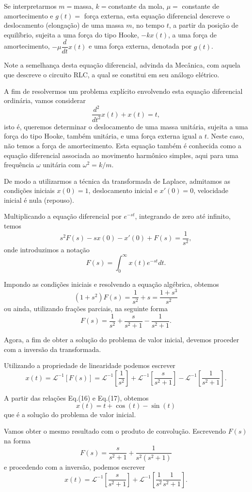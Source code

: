 Se interpretarmos $m=$massa, $k=$constante da mola, $\mu=$ constante de amortecimento e $g(t)=$ força externa, esta equação diferencial descreve o deslocamento (elongação) de uma massa $m$, no tempo $t$, a partir da posição de equilíbrio, sujeita a uma força do tipo Hooke, $-k x(t)$, a uma força de amortecimento, $-\mu \dfrac{d}{dt} x(t)$ e uma força externa, denotada por $g(t)$.

Note a semelhança desta equação diferencial, advinda da Mecânica, com aquela que descreve o circuito RLC, a qual se constitui em seu análogo elétrico.

A fim de resolvermos um problema explícito envolvendo esta equação diferencial ordinária, vamos considerar
$$\dfrac{d^{2}}{dt^{2}} x(t) + x(t) = t,$$
isto é, queremos determinar o deslocamento de uma massa unitária, sujeita a uma força do tipo Hooke, também unitária, e uma força externa igual a $t$. Neste caso, não temos a força de amortecimento. Esta equação também é conhecida como a equação diferencial associada ao movimento harmônico simples, aqui para uma frequência $\omega$ unitária com $\omega^{2} = k/m$.

De modo a utilizarmos a técnica da transformada de Laplace, admitamos as condições iniciais $x(0) = 1$, deslocamento inicial e $x'(0) = 0$, velocidade inicial é nula (repouso).

Multiplicando a equação diferencial por $e^{-st}$, integrando de zero até infinito, temos
$$s^{2}F(s) - sx(0) - x'(0) + F(s) = \dfrac{1}{s^{2}},$$
onde introduzimos a notação
$$F(s) = \int_{0}^{\infty} x(t) e^{-st}dt.$$

Impondo as condições iniciais e resolvendo a equação algébrica, obtemos
$$(1 + s^{2})F(s) =
\dfrac{1}{s^{2}} + s =
\dfrac{1 + s^{3}}{s^{2}}$$
ou ainda, utilizando frações parciais, na seguinte forma
$$
F(s) =
\dfrac{1}{s^{2}}
+
\dfrac{s}{s^{2} + 1}
-
\dfrac{1}{s^{2} + 1}.
$$

Agora, a fim de obter a solução do problema de valor inicial, devemos proceder com a inversão da transformada.

Utilizando a propriedade de linearidade podemos escrever
$$x(t) = \mathscr{L}^{-1}[F(s)]
= \mathscr{L}^{-1}
\left[
\dfrac{1}{s^{2}}
\right]
+ \mathscr{L}^{-1}
\left[
\dfrac{s}{s^{2} + 1}
\right]
- \mathscr{L}^{-1}
\left[
\dfrac{1}{s^{2} + 1}
\right].$$

A partir das relações Eq.(16) e Eq.(17), obtemos
$$x(t) = t + \cos(t) - \sin(t)$$
que é a solução do problema de valor inicial.

Vamos obter o mesmo resultado com o produto de convolução. Escrevendo $F(s)$ na forma
$$F(s) =
\dfrac{s}{s^{2} + 1}
+
\dfrac{1}{s^{2}(s^{2} + 1)}$$
e procedendo com a inversão, podemos escrever
$$x(t) = \mathscr{L}^{-1}
\left[
\dfrac{s}{s^{2} + 1}
\right]
+ \mathscr{L}^{-1}
\left[
\dfrac{1}{s^{2}}
\dfrac{1}{s^{2} + 1}
\right].$$


